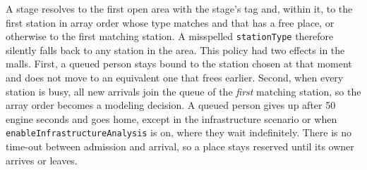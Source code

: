 A stage resolves to the first open area with the stage's tag and, within it, to the first station in array order whose type matches and that has a free place, or otherwise to the first matching station. A misspelled \texttt{stationType} therefore silently falls back to any station in the area. This policy had two effects in the malls. First, a queued person stays bound to the station chosen at that moment and does not move to an equivalent one that frees earlier. Second, when every station is busy, all new arrivals join the queue of the \emph{first} matching station, so the array order becomes a modeling decision. A queued person gives up after 50 engine seconds and goes home, except in the infrastructure scenario or when \texttt{enableInfrastructureAnalysis} is on, where they wait indefinitely. There is no time-out between admission and arrival, so a place stays reserved until its owner arrives or leaves.

